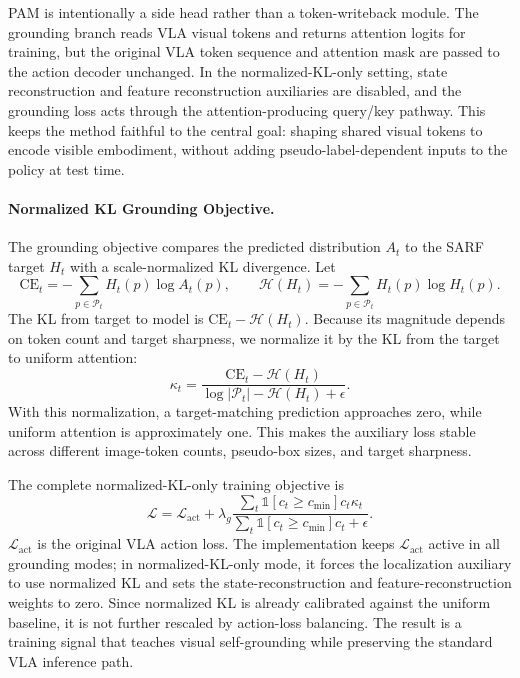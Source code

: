 PAM is intentionally a side head rather than a token-writeback module. The
grounding branch reads VLA visual tokens and returns attention logits for
training, but the original VLA token sequence and attention mask are passed to
the action decoder unchanged. In the normalized-KL-only setting, state
reconstruction and feature reconstruction auxiliaries are disabled, and the
grounding loss acts through the attention-producing query/key pathway. This
keeps the method faithful to the central goal: shaping shared visual tokens to
encode visible embodiment, without adding pseudo-label-dependent inputs to the
policy at test time.

\paragraph{Normalized KL Grounding Objective.}

The grounding objective compares the predicted distribution \(A_t\) to the
SARF target \(H_t\) with a scale-normalized KL divergence. Let
\[
    \mathrm{CE}_t
    =
    -\sum_{p\in\mathcal{P}_t} H_t(p)\log A_t(p),
    \qquad
    \mathcal{H}(H_t)
    =
    -\sum_{p\in\mathcal{P}_t}H_t(p)\log H_t(p).
\]
The KL from target to model is
\(\mathrm{CE}_t-\mathcal{H}(H_t)\). Because its magnitude depends on token
count and target sharpness, we normalize it by the KL from the target to
uniform attention:
\[
    \kappa_t
    =
    \frac{
    \mathrm{CE}_t-\mathcal{H}(H_t)
    }{
    \log|\mathcal{P}_t|-\mathcal{H}(H_t)+\epsilon
    } .
\]
With this normalization, a target-matching prediction approaches zero, while
uniform attention is approximately one. This makes the auxiliary loss stable
across different image-token counts, pseudo-box sizes, and target sharpness.

The complete normalized-KL-only training objective is
\[
    \mathcal{L}
    =
    \mathcal{L}_{\mathrm{act}}
    +
    \lambda_g
    \frac{
    \sum_t \mathbb{1}[c_t\ge c_{\min}]
    c_t \kappa_t
    }{
    \sum_t \mathbb{1}[c_t\ge c_{\min}]c_t+\epsilon
    } .
\]
\(\mathcal{L}_{\mathrm{act}}\) is the original VLA action loss. The
implementation keeps \(\mathcal{L}_{\mathrm{act}}\) active in all grounding
modes; in normalized-KL-only mode, it forces the localization auxiliary to use
normalized KL and sets the state-reconstruction and feature-reconstruction
weights to zero. Since normalized KL is already calibrated against the uniform
baseline, it is not further rescaled by action-loss balancing. The result is a
training signal that teaches visual self-grounding while preserving the
standard VLA inference path.
